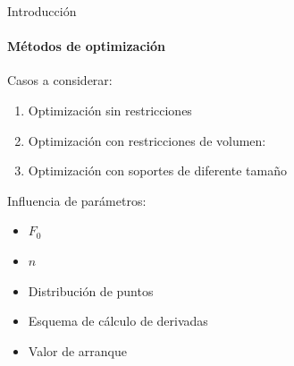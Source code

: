 \documentclass[11pt]{beamer}
\begin{document}
            \begin{frame}{Introducción}
            \framesubtitle{Métodos de optimización}
			\justifying
			Casos a considerar:
                \begin{enumerate}
                    \item Optimización sin restricciones
                    \item Optimización con restricciones de volumen:
                    \item Optimización con soportes de diferente tamaño
                \end{enumerate}

                Influencia de parámetros:
                \begin{itemize}
                    \item $F_0$
                    \item $n$
                    \item Distribución de puntos
                    \item Esquema de cálculo de derivadas
                    \item Valor de arranque
                \end{itemize}
		\end{frame}
	
\end{document}
